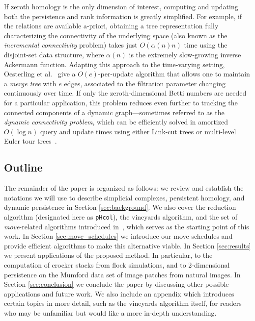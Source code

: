 \documentclass{article} %
\begin{document}
If  zeroth homology is the only dimension of interest, computing and updating both the persistence and rank information  is greatly simplified. For example, if the relations are available a-priori, obtaining a tree representation fully characterizing the connectivity of the underlying space (also known as the \emph{incremental connectivity} problem) takes just $O(\alpha(n) n)$ time using the disjoint-set data structure, where $\alpha(n)$ is the extremely slow-growing inverse Ackermann function. 
Adapting this approach to the time-varying setting, Oesterling et al.~\cite{oesterling2015computing} give a $O(e)$-per-update algorithm that allows one to maintain a \emph{merge tree} with $e$ edges,
associated to the filtration parameter changing continuously over time. 
If only the zeroth-dimensional Betti numbers are needed for a particular application, this problem reduces even further to tracking the connected components of a dynamic graph---sometimes referred to as the \emph{dynamic connectivity problem}, which can be efficiently  solved in amortized $O(\log n)$ query and update times using either Link-cut trees or multi-level Euler tour trees~\cite{kapron2013dynamic}.

\subsection{Outline} The remainder of the paper is organized as follows: we review and establish the notations we will use to describe simplicial complexes, persistent homology, and dynamic persistence in Section \ref{sec:background}. 
We also cover the reduction algorithm (designated here as \texttt{pHcol}), the vineyards algorithm, and the set of \emph{move}-related algorithms introduced in~\cite{busaryev2010tracking}, which serves as the starting point of this work. 
In Section \ref{sec:move_schedules} we introduce our move schedules  and provide efficient algorithms to make this alternative viable. 
In Section \ref{sec:results} we present applications of the proposed method. 
In particular, to the computation of crocker stacks from flock simulations, and to 2-dimensional persistence on the Mumford data set of image patches from natural images. 
In Section \ref{sec:conclusion} we conclude the paper by discussing other possible applications and future work. 
We also include an appendix which introduces certain topics in more detail, such as the vineyards algorithm itself, for readers who may be unfamiliar but would like a more in-depth understanding.


\end{document}
